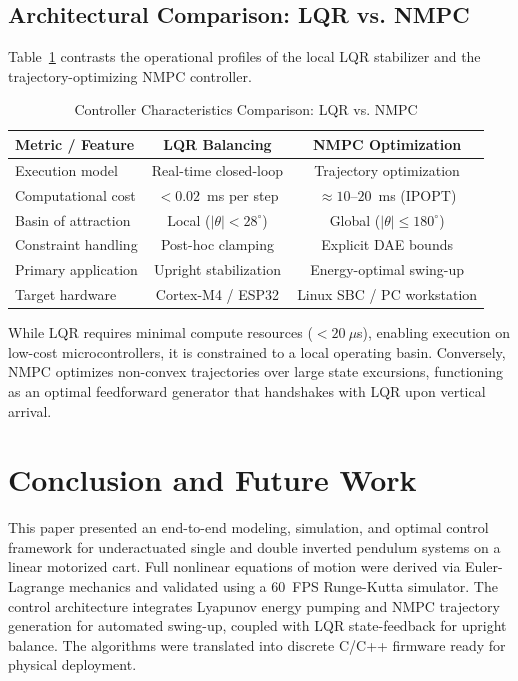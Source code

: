 \documentclass[conference]{IEEEtran}
\begin{document}
\subsection{Architectural Comparison: LQR vs. NMPC}
Table~\ref{tab:comparison} contrasts the operational profiles of the local LQR stabilizer and the trajectory-optimizing NMPC controller.

\begin{table}[htbp]
\caption{Controller Characteristics Comparison: LQR vs. NMPC}
\begin{center}
\begin{tabular}{lcc}
\toprule
\textbf{Metric / Feature} & \textbf{LQR Balancing} & \textbf{NMPC Optimization} \\
\midrule
Execution model          & Real-time closed-loop   & Trajectory optimization \\
Computational cost       & $< 0.02$~ms per step    & $\approx 10$--$20$~ms (IPOPT) \\
Basin of attraction      & Local ($|\theta| < 28^\circ$) & Global ($|\theta| \le 180^\circ$) \\
Constraint handling      & Post-hoc clamping       & Explicit DAE bounds \\
Primary application      & Upright stabilization   & Energy-optimal swing-up \\
Target hardware          & Cortex-M4 / ESP32       & Linux SBC / PC workstation \\
\bottomrule
\end{tabular}
\label{tab:comparison}
\end{center}
\end{table}

While LQR requires minimal compute resources ($< 20~\mu$s), enabling execution on low-cost microcontrollers, it is constrained to a local operating basin. Conversely, NMPC optimizes non-convex trajectories over large state excursions, functioning as an optimal feedforward generator that handshakes with LQR upon vertical arrival.

\section{Conclusion and Future Work}
This paper presented an end-to-end modeling, simulation, and optimal control framework for underactuated single and double inverted pendulum systems on a linear motorized cart. Full nonlinear equations of motion were derived via Euler-Lagrange mechanics and validated using a 60~FPS Runge-Kutta simulator. The control architecture integrates Lyapunov energy pumping and NMPC trajectory generation for automated swing-up, coupled with LQR state-feedback for upright balance. The algorithms were translated into discrete C/C++ firmware ready for physical deployment.
\end{document}
